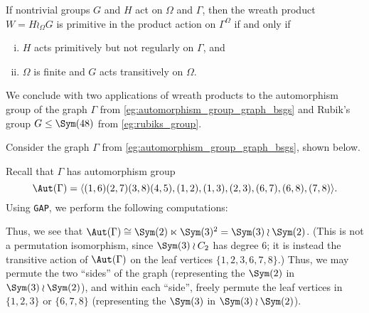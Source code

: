 \begin{proposition}
    If nontrivial groups $G$ and $H$ act on $\Omega$ and $\Gamma$, then the wreath product $W = H \wr_\Omega G$ is primitive in the product action on $\Gamma^\Omega$ if and only if
    \begin{enumerate}[(i)]
        \item $H$ acts primitively but not regularly on $\Gamma$, and
        \item $\Omega$ is finite and $G$ acts transitively on $\Omega$.
    \end{enumerate}
\end{proposition}

We conclude with two applications of wreath products to the automorphism group of the graph $\Gamma$ from \autoref{eg:automorphism_group_graph_bsgs} and Rubik's group $G \leq \Sym(48)$ from \autoref{eg:rubiks_group}.

\begin{example}\label{eg:automorphism_group_graph_wreath}
    Consider the graph $\Gamma$ from \autoref{eg:automorphism_group_graph_bsgs}, shown below.

    \begin{center}
    \end{center}

    Recall that $\Gamma$ has automorphism group
    $$\Aut(\Gamma) = \langle (1,6)(2,7)(3,8)(4,5), (1,2), (1,3), (2,3), (6,7), (6,8), (7,8) \rangle.$$
    Using \texttt{GAP}, we perform the following computations:

    

    Thus, we see that $\Aut(\Gamma) \cong \Sym(2) \ltimes \Sym(3)^2 = \Sym(3) \wr \Sym(2)$. (This is not a permutation isomorphism, since $\Sym(3) \wr C_2$ has degree 6; it is instead the transitive action of $\Aut(\Gamma)$ on the leaf vertices $\{1,2,3,6,7,8\}$.) Thus, we may permute the two ``sides'' of the graph (representing the $\Sym(2)$ in $\Sym(3) \wr \Sym(2)$), and within each ``side'', freely permute the leaf vertices in $\{1,2,3\}$ or $\{6,7,8\}$ (representing the $\Sym(3)$ in $\Sym(3) \wr \Sym(2)$).
\end{example}

